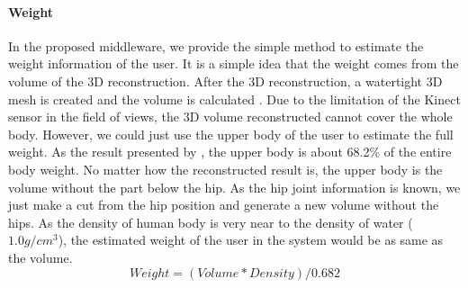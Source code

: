 \paragraph{Weight}
In the proposed middleware, we provide the simple method to estimate the weight information of the user. It is a simple idea that the weight comes from the volume of the 3D reconstruction. After the 3D reconstruction, a watertight 3D mesh is created and the volume is calculated \cite{Qiao2015}.
Due to the limitation of the Kinect sensor in the field of views, the 3D volume reconstructed cannot cover the whole body. However, we could just use the upper body of the user to estimate the full weight. As the result presented by \cite{Tozeren2000}, the upper body is about 68.2\% of the entire body weight. 
No matter how the reconstructed result is, the upper body is the volume without the part below the hip. As the hip joint information is known, we just make a cut from the hip position and generate a new volume without the hips.
As the density of human body is very near to the density of water ($1.0 g/cm^3$), the estimated weight of the user in the system would be as same as the volume.
\begin{equation}
Weight = (Volume * Density)/0.682
\end{equation}

